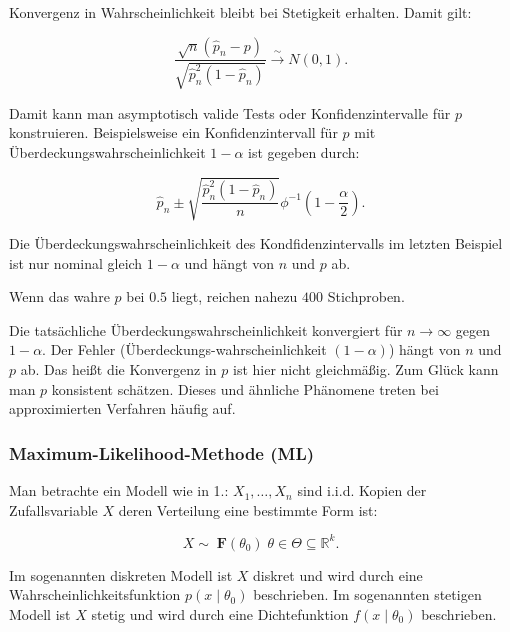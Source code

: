 \documentclass[10pt]{article}
\newcommand{\FZV}{X_1, \ldots, X_n} %
\newcommand{\IR}{\mathbb{R}} %
\newcommand{\KV}{\overset{\sim} \longrightarrow} %
\newenvironment{BSP}[1][]
{\begin{Beispiel}[frametitle=#1]}{\end{Beispiel}}
\begin{document}
\begin{BSP}[Beispiel 1.3.6 (Delta-Methode)]
		\noindent Konvergenz in Wahrscheinlichkeit bleibt bei Stetigkeit erhalten. Damit gilt:
		
		\begin{equation*}
			\frac{\sqrt{n}(\hat{p}_n-p)}{\sqrt{\hat{p}_n^2(1-\hat{p}_n)}} \KV N(0,1).
		\end{equation*}
		
		Damit kann man asymptotisch valide Tests oder Konfidenzintervalle für $p$ konstruieren. Beispielsweise ein Konfidenzintervall für $p$ mit Überdeckungswahrscheinlichkeit $1-\alpha$ ist gegeben durch:
		
		\begin{equation*}
			\hat{p}_n \pm \sqrt{\frac{\hat{p}_n^2 (1-\hat{p}_n)}{n}} \phi^{-1} \left(1-\frac{\alpha}{2}\right).
		\end{equation*}
		
	\end{BSP}
	
	\noindent Die Überdeckungswahrscheinlichkeit des Kondfidenzintervalls im letzten Beispiel ist nur nominal gleich $1-\alpha$ und hängt von $n$ und $p$ ab. 
	
	\noindent Wenn das wahre $p$ bei $0.5$ liegt, reichen nahezu $400$ Stichproben. 
	
	Die tatsächliche Überdeckungswahrscheinlichkeit konvergiert für  $n \rightarrow \infty$ gegen $1-\alpha$. Der Fehler (Überdeckungs-wahrscheinlichkeit $(1-\alpha)$) hängt von $n$ und $p$ ab. Das heißt die Konvergenz in $p$ ist hier nicht gleichmäßig. Zum Glück kann man $p$ konsistent schätzen. Dieses und ähnliche Phänomene treten bei approximierten Verfahren häufig auf. 
	
	
	\subsubsection{Maximum-Likelihood-Methode (ML)}
	
	Man betrachte ein Modell wie in 1.: $\FZV$ sind i.i.d. Kopien der Zufallsvariable $X$ deren Verteilung eine bestimmte Form ist: 
	
	\begin{equation*}
		X \sim \; \textbf{F}(\theta_0) \;	\theta \in \Theta \subseteq \IR^k.
	\end{equation*}
	 
	\noindent Im sogenannten diskreten Modell ist $X$ diskret und wird durch eine Wahrscheinlichkeitsfunktion $p(x \mid \theta_0)$ beschrieben. 
	Im sogenannten stetigen Modell ist $X$ stetig und wird durch eine Dichtefunktion $f(x \mid \theta_0)$ beschrieben. 
	
\end{document}
